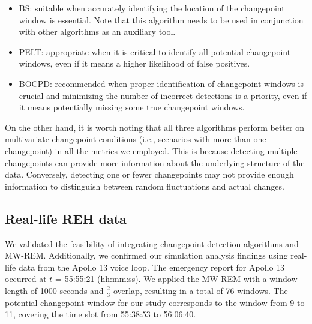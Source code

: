 \documentclass[]{interact}
\theoremstyle{plain}%
\theoremstyle{definition}
\theoremstyle{remark}
\begin{document}
    \begin{itemize}
    	\item BS: suitable when accurately identifying the location of the changepoint window is essential. Note that this algorithm needs to be used in conjunction with other algorithms as an auxiliary tool. \\
    	
    	\item PELT: appropriate when it is critical to identify all potential changepoint windows, even if it means a higher likelihood of false positives. \\
    	
    	\item BOCPD: recommended when proper identification of changepoint windows is crucial and minimizing the number of incorrect detections is a priority, even if it means potentially missing some true changepoint windows.
    \end{itemize}
    
    On the other hand, it is worth noting that all three algorithms perform better on multivariate changepoint conditions (i.e., scenarios with more than one changepoint) in all the metrics we employed. This is because detecting multiple changepoints can provide more information about the underlying structure of the data. Conversely, detecting one or fewer changepoints may not provide enough information to distinguish between random fluctuations and actual changes\cite{liReviewChangepointDetection2019}.
    
	\subsection{Real-life REH data} \label{res:Apollo 13}
	
	\hspace{0.28cm} We validated the feasibility of integrating changepoint detection algorithms and MW-REM. Additionally, we confirmed our simulation analysis findings using real-life data from the Apollo 13 voice loop. The emergency report for Apollo 13 occurred at $t$ = 55:55:21 (hh:mm:ss). We applied the MW-REM with a window length of 1000 seconds and $\frac{2}{3}$ overlap, resulting in a total of 76 windows. The potential changepoint window for our study corresponds to the window from 9 to 11, covering the time slot from 55:38:53 to 56:06:40. \\
	
\end{document}
